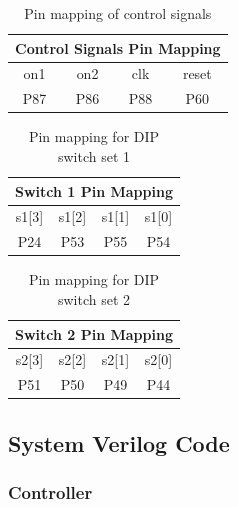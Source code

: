 \documentclass[11pt]{article}
\begin{document}
\begin{table}[h]
\centering
\begin{tabular}{|c|c|c|c|}
\hline
\multicolumn{4}{|c|}{\textbf{Control Signals Pin Mapping}} \\ \hline
on1        & on2        & clk        & reset       \\ \hline
P87        & P86        & P88        & P60         \\ \hline
\end{tabular}
\caption{Pin mapping of control signals}
\label{table:pinmap_control}
\end{table}


\begin{table}[h]
\centering
\begin{tabular}{|c|c|c|c|}
\hline
\multicolumn{4}{|c|}{\textbf{Switch 1 Pin Mapping}} \\ \hline
s1{[}3{]}  & s1{[}2{]}  & s1{[}1{]} & s1{[}0{]} \\ \hline
P24        & P53        & P55       & P54       \\ \hline
\end{tabular}
\caption{Pin mapping for DIP switch set 1}
\label{table:pinmap_sw1}
\end{table}


\begin{table}[h]
\centering
\begin{tabular}{|c|c|c|c|}
\hline
\multicolumn{4}{|c|}{\textbf{Switch 2 Pin Mapping}} \\ \hline
s2{[}3{]}  & s2{[}2{]}  & s2{[}1{]} & s2{[}0{]} \\ \hline
P51        & P50        & P49       & P44       \\ \hline
\end{tabular}
\caption{Pin mapping for DIP switch set 2}
\label{table:pinmap_sw2}
\end{table}



\clearpage
\subsection{System Verilog Code}

\subsubsection{Controller}
\end{document}

